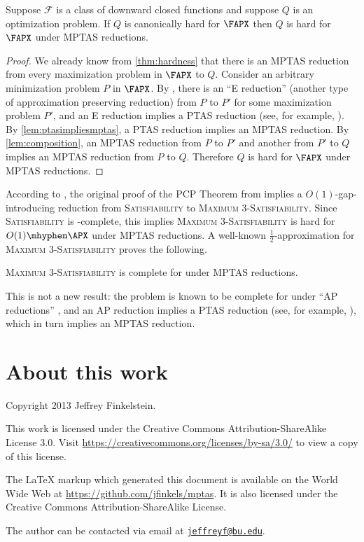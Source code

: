 \documentclass{article}
\newcommand{\email}[1]{\href{mailto:#1}{\nolinkurl{#1}}}
\begin{document}
\begin{corollary}[{\cite[Theorem~3]{ep06}}]
  Suppose $\mathcal{F}$ is a class of downward closed functions and suppose $Q$ is an optimization problem.
  If $Q$ is canonically hard for $\FAPX$ then $Q$ is hard for $\FAPX$ under MPTAS reductions.
\end{corollary}
\begin{proof}
  We already know from \autoref{thm:hardness} that there is an MPTAS reduction from every maximization problem in $\FAPX$ to $Q$.
  Consider an arbitrary minimization problem $P$ in $\FAPX$.
  By \cite{ep06}, there is an ``E reduction'' (another type of approximation preserving reduction) from $P$ to $P'$ for some maximization problem $P'$, and an E reduction implies a PTAS reduction (see, for example, \cite[Figure~2]{crescenzi97}).
  By \autoref{lem:ptasimpliesmptas}, a PTAS reduction implies an MPTAS reduction.
  By \autoref{lem:composition}, an MPTAS reduction from $P$ to $P'$ and another from $P'$ to $Q$ implies an MPTAS reduction from $P$ to $Q$.
  Therefore $Q$ is hard for $\FAPX$ under MPTAS reductions.
\end{proof}

According to \cite[Section~4.6]{ap06}, the original proof of the PCP Theorem from \cite{almss92} implies a $O(1)$-gap-introducing reduction from \textsc{Satisfiability} to \textsc{Maximum 3-Satisfiability}.
Since \textsc{Satisfiability} is \NP-complete, this implies \textsc{Maximum 3-Satisfiability} is hard for $O(1)\mhyphen\APX$ under MPTAS reductions.
A well-known $\frac{1}{2}$-approximation for \textsc{Maximum 3-Satisfiability} proves the following.
\begin{theorem}
  \textsc{Maximum 3-Satisfiability} is complete for \APX{} under MPTAS reductions.
\end{theorem}
This is not a new result: the problem is known to be complete for \APX{} under ``AP reductions'' \cite[Corollary~8.8]{acgkmp99}, and an AP reduction implies a PTAS reduction (see, for example, \cite[Figure~2]{crescenzi97}), which in turn implies an MPTAS reduction.

\section*{About this work}

Copyright 2013 Jef{}frey Finkelstein.

This work is licensed under the Creative Commons Attribution-ShareAlike License 3.0.
Visit \mbox{\url{https://creativecommons.org/licenses/by-sa/3.0/}} to view a copy of this license.

The \LaTeX{} markup which generated this document is available on the World Wide Web at \mbox{\url{https://github.com/jfinkels/mptas}}.
It is also licensed under the Creative Commons Attribution-ShareAlike License.

The author can be contacted via email at \email{jeffreyf@bu.edu}.



\end{document}
